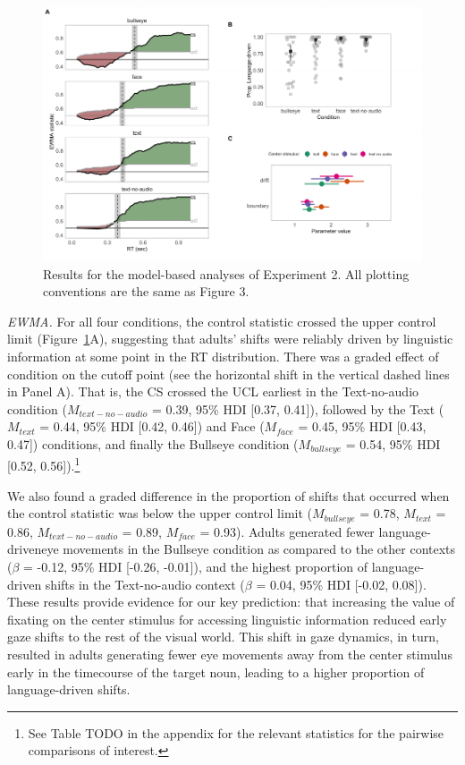 \documentclass[english,floatsintext,man]{apa6}
\begin{document}
\begin{figure}[!t]

{\centering \includegraphics[width=0.9\linewidth]{figs/text-model-plots-1} 

}

\caption{Results for the model-based analyses of Experiment 2. All plotting conventions are the same as Figure 3.}\label{fig:text-model-plots}
\end{figure}

\emph{EWMA.} For all four conditions, the control statistic crossed the
upper control limit (Figure~\ref{fig:text-model-plots}A), suggesting
that adults' shifts were reliably driven by linguistic information at
some point in the RT distribution. There was a graded effect of
condition on the cutoff point (see the horizontal shift in the vertical
dashed lines in Panel A). That is, the CS crossed the UCL earliest in
the Text-no-audio condition (\(M_{text-no-audio}\) = 0.39, 95\% HDI
{[}0.37, 0.41{]}), followed by the Text (\(M_{text}\) = 0.44, 95\% HDI
{[}0.42, 0.46{]}) and Face (\(M_{face}\) = 0.45, 95\% HDI {[}0.43,
0.47{]}) conditions, and finally the Bullseye condition
(\(M_{bullseye}\) = 0.54, 95\% HDI {[}0.52, 0.56{]}).\footnote{See Table
  TODO in the appendix for the relevant statistics for the pairwise
  comparisons of interest.}

We also found a graded difference in the proportion of shifts that
occurred when the control statistic was below the upper control limit
(\(M_{bullseye}\) = 0.78, \(M_{text}\) = 0.86, \(M_{text-no-audio}\) =
0.89, \(M_{face}\) = 0.93). Adults generated fewer language-driveneye
movements in the Bullseye condition as compared to the other contexts
(\(\beta\) = -0.12, 95\% HDI {[}-0.26, -0.01{]}), and the highest
proportion of language-driven shifts in the Text-no-audio context
(\(\beta\) = 0.04, 95\% HDI {[}-0.02, 0.08{]}). These results provide
evidence for our key prediction: that increasing the value of fixating
on the center stimulus for accessing linguistic information reduced
early gaze shifts to the rest of the visual world. This shift in gaze
dynamics, in turn, resulted in adults generating fewer eye movements
away from the center stimulus early in the timecourse of the target
noun, leading to a higher proportion of language-driven shifts.
\end{document}
